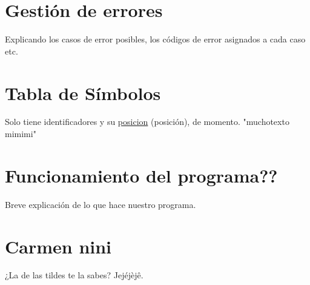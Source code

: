 \documentclass{article}
\begin{document}
\section{Gestión de errores}
Explicando los casos de error posibles, los códigos de error asignados a cada caso etc.

\section{Tabla de Símbolos}
Solo tiene identificadores y su \underline{posicion} (posición), de momento. "muchotexto mimimi"

\section{Funcionamiento del programa??}
Breve explicación de lo que hace nuestro programa.

\section{Carmen nini}
¿La de las tildes te la sabes? Jejéjèjê.
\end{document}
